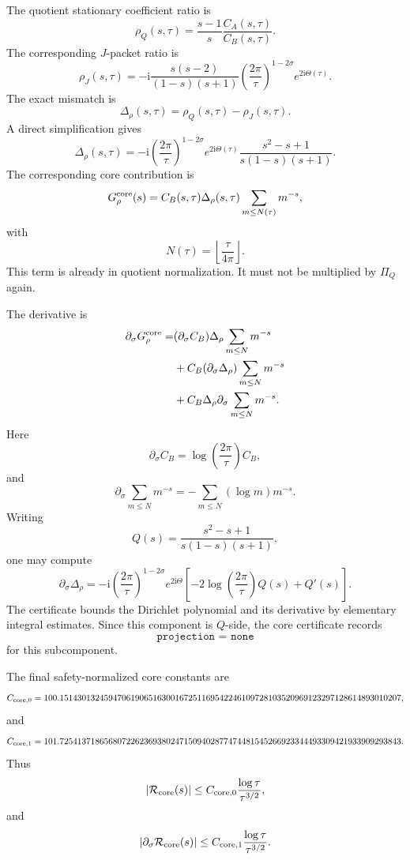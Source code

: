 \documentclass[11pt]{article}
\newcommand{\ii}{\mathrm{i}}
\newcommand{\s}{s}
\newcommand{\sig}{\sigma}
\newcommand{\tauh}{\tau}
\newcommand{\Rcore}{\mathcal R_{\rm core}}
\newcommand{\PiQ}{\Pi_Q}
\newcommand{\JSON}[1]{\texttt{#1}}
\begin{document}
The quotient stationary coefficient ratio is
\[
        \rho_Q(\s,\tauh)
        =
        \frac{\s-1}{\s}
        \frac{C_A(\s,\tauh)}{C_B(\s,\tauh)}.
\]
The corresponding \(J\)-packet ratio is
\[
        \rho_J(\s,\tauh)
        =
        -\ii
        \frac{\s(\s-2)}{(1-\s)(\s+1)}
        \left(\frac{2\pi}{\tauh}\right)^{1-2\sig}
        e^{2\ii\Theta(\tauh)}.
\]
The exact mismatch is
\[
        \Delta_\rho(\s,\tauh)
        =
        \rho_Q(\s,\tauh)-\rho_J(\s,\tauh).
\]
A direct simplification gives
\[
        \Delta_\rho(\s,\tauh)
        =
        -\ii
        \left(\frac{2\pi}{\tauh}\right)^{1-2\sig}
        e^{2\ii\Theta(\tauh)}
        \frac{\s^2-\s+1}{\s(1-\s)(\s+1)}.
\]
The corresponding core contribution is
\[
        G_{\rho}^{\rm core}(\s)
        =
        C_B(\s,\tauh)
        \Delta_\rho(\s,\tauh)
        \sum_{m\le N(\tauh)}m^{-\s},
\]
with
\[
        N(\tauh)
        =
        \left\lfloor \frac{\tauh}{4\pi}\right\rfloor.
\]
This term is already in quotient normalization.  It must not be multiplied by
\(\PiQ\) again.

The derivative is
\[
\begin{aligned}
        \partial_\sig G_{\rho}^{\rm core}
        =
        &(\partial_\sig C_B)\Delta_\rho
        \sum_{m\le N}m^{-\s}
        \\
        &+
        C_B(\partial_\sig\Delta_\rho)
        \sum_{m\le N}m^{-\s}
        \\
        &+
        C_B\Delta_\rho
        \partial_\sig
        \sum_{m\le N}m^{-\s}.
\end{aligned}
\]
Here
\[
        \partial_\sig C_B
        =
        \log\left(\frac{2\pi}{\tauh}\right)C_B,
\]
and
\[
        \partial_\sig
        \sum_{m\le N}m^{-\s}
        =
        -\sum_{m\le N}(\log m)m^{-\s}.
\]
Writing
\[
        Q(\s)
        =
        \frac{\s^2-\s+1}{\s(1-\s)(\s+1)},
\]
one may compute
\[
        \partial_\sig\Delta_\rho
        =
        -\ii
        \left(\frac{2\pi}{\tauh}\right)^{1-2\sig}
        e^{2\ii\Theta}
        \left[
            -2\log\left(\frac{2\pi}{\tauh}\right)Q(\s)
            +
            Q'(\s)
        \right].
\]
The certificate bounds the Dirichlet polynomial and its derivative by
elementary integral estimates.  Since this component is \(Q\)-side, the core
certificate records
\[
        \JSON{projection = none}
\]
for this subcomponent.

The final safety-normalized core constants are
\[
        C_{{\rm core},0}
        =
        100.15143013245947061906516300167251169542246109728103520969123297128614893010207,
\]
and
\[
        C_{{\rm core},1}
        =
        101.72541371865680722623693802471509402877474481545266923344493309421933909293843.
\]
Thus
\[
        |\Rcore(\s)|
        \le
        C_{{\rm core},0}
        \frac{\log\tauh}{\tauh^{3/2}},
\]
and
\[
        |\partial_\sig\Rcore(\s)|
        \le
        C_{{\rm core},1}
        \frac{\log\tauh}{\tauh^{3/2}}.
\]
\end{document}
